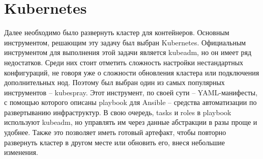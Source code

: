 \section{Kubernetes}
\label{sec:k8s}

Далее необходимо было развернуть кластер для контейнеров. Основным инструментом, решающим эту задачу был выбран Kubernetes.
Официальным инструментом для выполнения этой задачи является kubeadm,
но он имеет ряд недостатков. Среди них стоит отметить сложность настройки нестандартных конфигураций, не говоря уже о сложности обновления кластера или подключения дополнительных нод. Поэтому был выбран один из самых популярных инструментов -- kubespray.
Этот инструмент, по своей сути -- YAML-манифесты,
с помощью которого описаны playbook
для Ansible
-- средства автоматизации по развертыванию инфраструктур. В свою очередь, tasks
и roles
в playbook используют kubeadm, но управлять им через данные абстракции в разы проще и удобнее. Также это позволяет иметь готовый артефакт, чтобы повторно развернуть кластер в другом месте или обновить его, внеся небольшие изменения.

